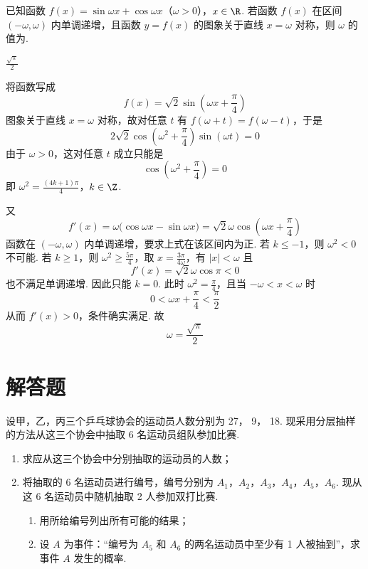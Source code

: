 \begin{problem}
已知函数 \(f(x) = \sin \omega x + \cos \omega x\)（\(\omega > 0\)），\( x \in \R \). 若函数 \( f(x) \) 在区间 \((- \omega, \omega)\) 内单调递增，且函数 \( y = f(x) \) 的图象关于直线 \( x = \omega \) 对称，则 \( \omega \) 的值为\fillinblank{}.
\end{problem}

\begin{answer}
\(\frac{\sqrt{\pi}}{2}\)
\end{answer}

\begin{solution}
将函数写成
\[
f(x)=\sqrt{2}\sin\left(\omega x+\frac{\pi}{4}\right)
\]
图象关于直线 \(x=\omega\) 对称，故对任意 \(t\) 有 \(f(\omega+t)=f(\omega-t)\)，于是
\[
2\sqrt{2}\cos\left(\omega^2+\frac{\pi}{4}\right)\sin(\omega t)=0
\]
由于 \(\omega>0\)，这对任意 \(t\) 成立只能是
\[
\cos\left(\omega^2+\frac{\pi}{4}\right)=0
\]
即
\(\omega^2=\frac{(4k+1)\pi}{4}\)，\(k\in\Z\).

又
\[
f'(x)=\omega\bigl(\cos\omega x-\sin\omega x\bigr)=\sqrt{2}\omega\cos\left(\omega x+\frac{\pi}{4}\right)
\]
函数在 \((-\omega,\omega)\) 内单调递增，要求上式在该区间内为正. 若 \(k\leqslant-1\)，则 \(\omega^2<0\) 不可能. 若 \(k\geqslant1\)，则 \(\omega^2\geqslant\frac{5\pi}{4}\)，取 \(x=\frac{3\pi}{4\omega}\)，有 \(|x|<\omega\) 且
\[
f'(x)=\sqrt{2}\omega\cos\pi<0
\]
也不满足单调递增. 因此只能 \(k=0\). 此时 \(\omega^2=\frac{\pi}{4}\)，且当 \(-\omega<x<\omega\) 时
\[
0<\omega x+\frac{\pi}{4}<\frac{\pi}{2}
\]
从而 \(f'(x)>0\)，条件确实满足. 故
\[
\omega=\frac{\sqrt{\pi}}{2}
\]
\end{solution}

\section{解答题}

\begin{problem}
设甲，乙，丙三个乒乓球协会的运动员人数分别为 27， 9， 18. 现采用分层抽样的方法从这三个协会中抽取 6 名运动员组队参加比赛.
\begin{enumerate}
\item 求应从这三个协会中分别抽取的运动员的人数；
\item 将抽取的 6 名运动员进行编号，编号分别为 \(A_{1}\)，\(A_{2}\)，\(A_{3}\)，\(A_{4}\)，\(A_{5}\)，\(A_{6}\). 现从这 6 名运动员中随机抽取 2 人参加双打比赛.
\begin{enumerate}
\item 用所给编号列出所有可能的结果；
\item 设 \(A\) 为事件：“编号为 \(A_{5}\) 和 \(A_{6}\) 的两名运动员中至少有 1 人被抽到”，求事件 \(A\) 发生的概率.
\end{enumerate}
\end{enumerate}
\end{problem}

